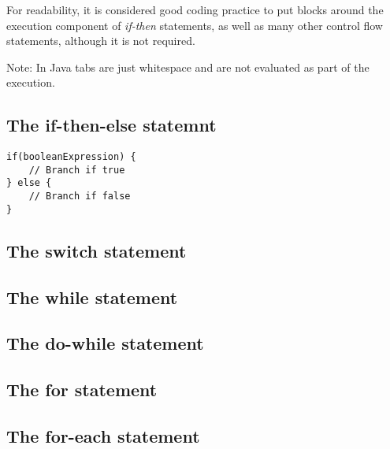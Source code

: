 \documentclass{article}
\begin{document}
For readability, it is considered good coding practice to put blocks around the execution component of \emph{if-then} statements, as well as many other control flow statements, although it is not required.

Note: In Java tabs are just whitespace and are not evaluated as part of the execution.

\subsection{The if-then-else statemnt}

\begin{lstlisting}
if(booleanExpression) {
	// Branch if true
} else {
	// Branch if false
}
\end{lstlisting}

\subsection{The switch statement}
\subsection{The while statement}
\subsection{The do-while statement}
\subsection{The for statement}
\subsection{The for-each statement}
\end{document}
